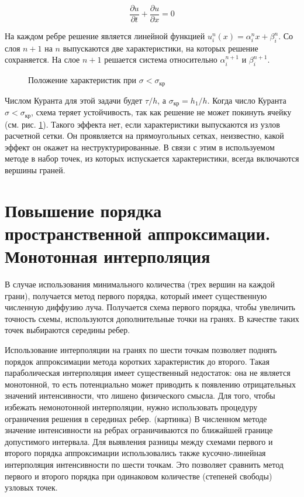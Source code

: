 \begin {equation}
\frac{\partial u}{\partial t} + \frac{\partial u}{\partial x} = 0
\end {equation}

На каждом ребре решение является линейной функцией $u_i^n(x) = \alpha_i^nx+\beta_i^n $. Со слоя $n+1$ на $n$ выпускаются две характеристики, на которых решение сохраняется. На слое $n+1$ решается система относительно $\alpha_i^{n+1}$ и $\beta_i^{n+1}$. 

\begin{figure}[ht!]
\caption{Положение характеристик при $\sigma < \sigma_\text{кр}$}
\label{fig:5}
\end{figure}
Числом Куранта для этой задачи будет $\tau/h$, а $\sigma_\text{кр} = h_1/h$. Когда число Куранта $\sigma < \sigma_\text{кр}$, схема теряет устойчивость, так как решение не может покинуть ячейку (см. рис. \ref{fig:5}). Такого эффекта нет, если характеристики выпускаются из узлов расчетной сетки. Он проявляется на прямоугольных сетках, неизвестно, какой эффект он окажет на неструктурированные. В связи с этим в используемом методе в набор точек, из которых испускается характеристики, всегда включаются вершины граней. 
\section{Повышение порядка пространственной аппроксимации. Монотонная интерполяция}
В случае использования минимального количества (трех вершин на каждой грани), получается метод первого порядка, который имеет существенную численную диффузию луча. Получается схема первого порядка, чтобы увеличить точность схемы, используются дополнительные точки на гранях. В качестве таких точек выбираются середины ребер. 

Использование интерполяции на гранях по шести точкам позволяет поднять порядок аппроксимации метода коротких характеристик до второго. Такая параболическая интерполяция имеет существенный недостаток: она не является монотонной, то есть потенциально может приводить к появлению отрицательных значений интенсивности, что лишено физического смысла. Для того, чтобы избежать немонотонной интерполяции, нужно использовать процедуру ограничения решения в серединах ребер.
(картинка)
В численном методе значение интенсивности на ребрах ограничиваются по ближайшей границе допустимого интервала. Для выявления разницы между схемами первого и второго порядка аппроксимации использовались также кусочно-линейная интерполяция интенсивности по шести точкам. Это позволяет сравнить метод первого и второго порядка при одинаковом количестве (степеней свободы) узловых точек. 

